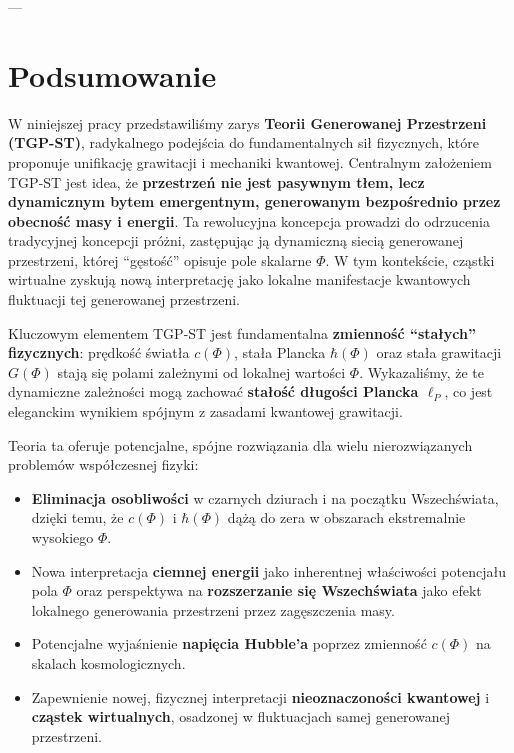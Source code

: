 \documentclass[11pt,a4paper]{article}
\begin{document}
---

\section{Podsumowanie}
\label{sec:Podsumowanie}

W niniejszej pracy przedstawiliśmy zarys \textbf{Teorii Generowanej Przestrzeni (TGP-ST)}, radykalnego podejścia do fundamentalnych sił fizycznych, które proponuje unifikację grawitacji i mechaniki kwantowej. Centralnym założeniem TGP-ST jest idea, że \textbf{przestrzeń nie jest pasywnym tłem, lecz dynamicznym bytem emergentnym, generowanym bezpośrednio przez obecność masy i energii}. Ta rewolucyjna koncepcja prowadzi do odrzucenia tradycyjnej koncepcji próżni, zastępując ją dynamiczną siecią generowanej przestrzeni, której ``gęstość'' opisuje pole skalarne $\Phi$. W tym kontekście, cząstki wirtualne zyskują nową interpretację jako lokalne manifestacje kwantowych fluktuacji tej generowanej przestrzeni.

Kluczowym elementem TGP-ST jest fundamentalna \textbf{zmienność ``stałych'' fizycznych}: prędkość światła $c(\Phi)$, stała Plancka $\hbar(\Phi)$ oraz stała grawitacji $G(\Phi)$ stają się polami zależnymi od lokalnej wartości $\Phi$. Wykazaliśmy, że te dynamiczne zależności mogą zachować \textbf{stałość długości Plancka $\ell_P$}, co jest eleganckim wynikiem spójnym z zasadami kwantowej grawitacji.

Teoria ta oferuje potencjalne, spójne rozwiązania dla wielu nierozwiązanych problemów współczesnej fizyki:
\begin{itemize}
    \item \textbf{Eliminacja osobliwości} w czarnych dziurach i na początku Wszechświata, dzięki temu, że $c(\Phi)$ i $\hbar(\Phi)$ dążą do zera w obszarach ekstremalnie wysokiego $\Phi$.
    \item Nowa interpretacja \textbf{ciemnej energii} jako inherentnej właściwości potencjału pola $\Phi$ oraz perspektywa na \textbf{rozszerzanie się Wszechświata} jako efekt lokalnego generowania przestrzeni przez zagęszczenia masy.
    \item Potencjalne wyjaśnienie \textbf{napięcia Hubble'a} poprzez zmienność $c(\Phi)$ na skalach kosmologicznych.
    \item Zapewnienie nowej, fizycznej interpretacji \textbf{nieoznaczoności kwantowej} i \textbf{cząstek wirtualnych}, osadzonej w fluktuacjach samej generowanej przestrzeni.
\end{itemize}
\end{document}
